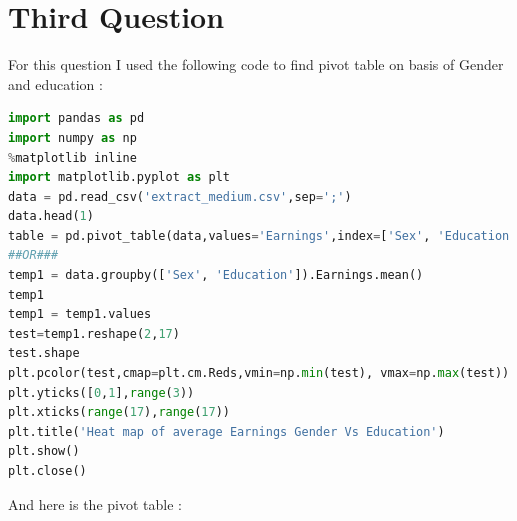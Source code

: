 \documentclass{article}
\begin{document}
\section*{Third Question}
For this question I used the following code to find pivot table on basis of Gender and education :
\begin{lstlisting}[language=Python]
import pandas as pd
import numpy as np
%matplotlib inline
import matplotlib.pyplot as plt
data = pd.read_csv('extract_medium.csv',sep=';')
data.head(1)
table = pd.pivot_table(data,values='Earnings',index=['Sex', 'Education'],aggfunc=np.mean)
##OR###
temp1 = data.groupby(['Sex', 'Education']).Earnings.mean()
temp1
temp1 = temp1.values
test=temp1.reshape(2,17)
test.shape
plt.pcolor(test,cmap=plt.cm.Reds,vmin=np.min(test), vmax=np.max(test))
plt.yticks([0,1],range(3))
plt.xticks(range(17),range(17))
plt.title('Heat map of average Earnings Gender Vs Education')
plt.show()
plt.close()
\end{lstlisting}
And here is the pivot table : 
\end{document}
